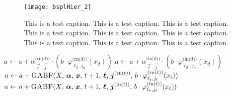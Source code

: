\begin{figure}
  \texttt{[image: bsplHier\_2]}
  \caption{%
    This is a test caption.
    This is a test caption.
    This is a test caption.
    This is a test caption.
    This is a test caption.
    This is a test caption.
    This is a test caption.
    This is a test caption.
    This is a test caption.%
  }
  \label{fig:test2}
\end{figure}

\begin{algorithm}
  \begin{algorithmic}[1]
    \Statex{}
    \EndIf\vspace{-0.25em}
    \color{green}
    $a \gets a + \alpha_{\vec{\ell},\vec{j}}^{\text{(rn($d$))}} \cdot
    (b \cdot \varphi_{\ell_d,j_d}^{\text{(rn($d$))}}(x_d))$
    \EndIf
    \label{line:getaffected1}
    $a \gets a + \alpha_{\vec{\ell},\vec{j}}^{\text{(ln($d$))}} \cdot
    (b \cdot \varphi_{\ell_d,j_d}^{\text{(ln($d$))}}(x_d))$
    \EndIf\vspace{-0.4em}
    \label{line:getaffected2}
    \color{black}
    \Else
    \label{line:getaffected5}
    \color{green}
    $a \gets a + \text{\Call{GABF}{$X$, $\vec{\alpha}$, $\vec{x}$, $t+1$,
        $\vec{\ell}$, $\vec{j}^{\text{(rn($t$))}}$,
        $b \cdot \varphi_{\ell_t,j_t}^{\text{(rn($t$))}}(x_t)$}}$
    \EndIf
    \label{line:getaffected3}
    $a \gets a + \text{\Call{GABF}{$X$, $\vec{\alpha}$, $\vec{x}$, $t+1$,
        $\vec{\ell}$, $\vec{j}^{\text{(ln($t$))}}$,
        $b \cdot \varphi_{\ell_t,j_t}^{\text{(ln($t$))}}(x_t)$}}$

\end{algorithmic}
\end{algorithm}
